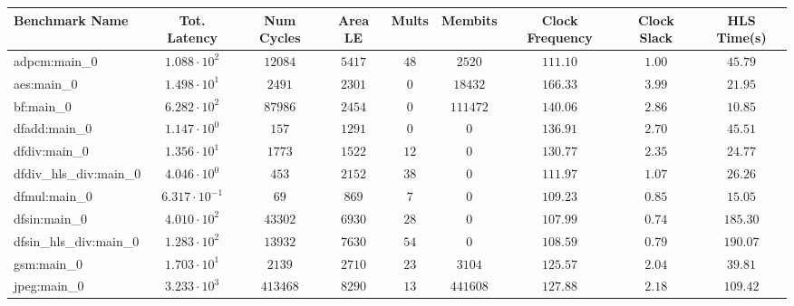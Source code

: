 \begin{tabular}{|l|c|c|c|c|c|c|c|c|}
\hline
Benchmark Name          & Tot. Latency            & Num Cycles & Area LE   & Mults   & Membits    & Clock Frequency & Clock Slack & HLS Time(s) \\
\hline
adpcm:main\_0           & $ 1.088 \cdot 10^{2}  $ & $ 12084  $ & $ 5417  $ & $ 48  $ & $ 2520   $ & $ 111.10      $ & $ 1.00    $ & $ 45.79   $ \\
aes:main\_0             & $ 1.498 \cdot 10^{1}  $ & $ 2491   $ & $ 2301  $ & $ 0   $ & $ 18432  $ & $ 166.33      $ & $ 3.99    $ & $ 21.95   $ \\
bf:main\_0              & $ 6.282 \cdot 10^{2}  $ & $ 87986  $ & $ 2454  $ & $ 0   $ & $ 111472 $ & $ 140.06      $ & $ 2.86    $ & $ 10.85   $ \\
dfadd:main\_0           & $ 1.147 \cdot 10^{0}  $ & $ 157    $ & $ 1291  $ & $ 0   $ & $ 0      $ & $ 136.91      $ & $ 2.70    $ & $ 45.51   $ \\
dfdiv:main\_0           & $ 1.356 \cdot 10^{1}  $ & $ 1773   $ & $ 1522  $ & $ 12  $ & $ 0      $ & $ 130.77      $ & $ 2.35    $ & $ 24.77   $ \\
dfdiv\_hls\_div:main\_0 & $ 4.046 \cdot 10^{0}  $ & $ 453    $ & $ 2152  $ & $ 38  $ & $ 0      $ & $ 111.97      $ & $ 1.07    $ & $ 26.26   $ \\
dfmul:main\_0           & $ 6.317 \cdot 10^{-1} $ & $ 69     $ & $ 869   $ & $ 7   $ & $ 0      $ & $ 109.23      $ & $ 0.85    $ & $ 15.05   $ \\
dfsin:main\_0           & $ 4.010 \cdot 10^{2}  $ & $ 43302  $ & $ 6930  $ & $ 28  $ & $ 0      $ & $ 107.99      $ & $ 0.74    $ & $ 185.30  $ \\
dfsin\_hls\_div:main\_0 & $ 1.283 \cdot 10^{2}  $ & $ 13932  $ & $ 7630  $ & $ 54  $ & $ 0      $ & $ 108.59      $ & $ 0.79    $ & $ 190.07  $ \\
gsm:main\_0             & $ 1.703 \cdot 10^{1}  $ & $ 2139   $ & $ 2710  $ & $ 23  $ & $ 3104   $ & $ 125.57      $ & $ 2.04    $ & $ 39.81   $ \\
jpeg:main\_0            & $ 3.233 \cdot 10^{3}  $ & $ 413468 $ & $ 8290  $ & $ 13  $ & $ 441608 $ & $ 127.88      $ & $ 2.18    $ & $ 109.42  $ \\

\end{tabular}
